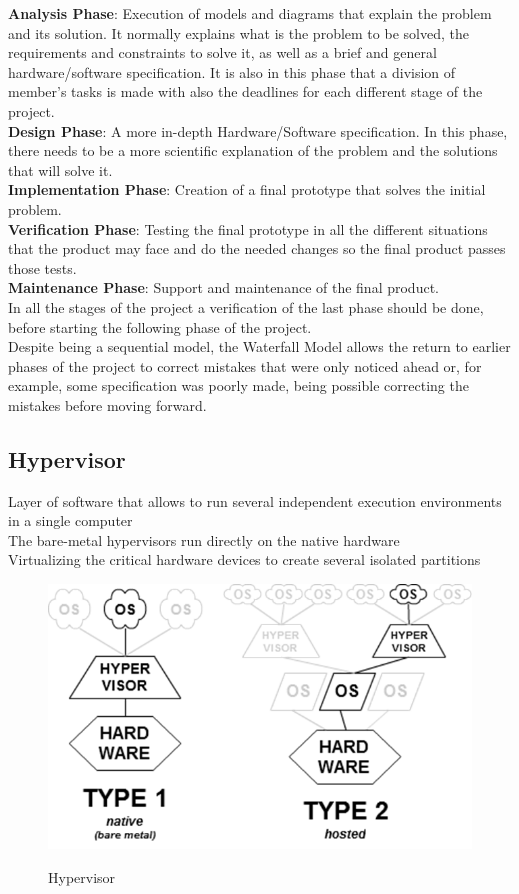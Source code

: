 \noindent \textbf{Analysis Phase}: Execution of models and diagrams that explain the problem and its solution. It normally explains what is the problem to be solved, the requirements and constraints to solve it, as well as a brief and general hardware/software specification. It is also in this phase that a division of member’s tasks is made with also the deadlines for each different stage of the project. \\[\baselineskip]
\textbf{Design Phase}: A more in-depth Hardware/Software specification. In this phase, there needs to be a more scientific explanation of the problem and the solutions that will solve it.\\[\baselineskip]
\textbf{Implementation Phase}: Creation of a final prototype that solves the initial problem.\\[\baselineskip]
\textbf{Verification Phase}: Testing the final prototype in all the different situations that the product may face and do the needed changes so the final product passes those tests.\\[\baselineskip]
\textbf{Maintenance Phase}: Support and maintenance of the final product.\\[\baselineskip]
\indent In all the stages of the project a verification of the last phase should be done, before starting the following phase of the project.\\
\indent Despite being a sequential model, the Waterfall Model allows the return to earlier
phases of the project to correct mistakes that were only noticed ahead or, for example, some specification was poorly made, being possible correcting the mistakes before moving forward.

\subsection{Hypervisor}
Layer of software that allows to run several independent execution environments in a single
computer\\
\indent The bare-metal hypervisors run directly on the native hardware\\
\indent Virtualizing the critical hardware devices to create several isolated partitions

\begin{figure}[!h]
	\center
	\label{figure6}
	\includegraphics[scale=0.65]{Figures/Hypervisor} \\
	\caption {Hypervisor}
\end{figure}
